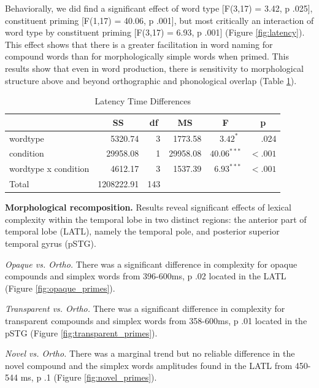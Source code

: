 \documentclass{frontiersSCNS}
\begin{document}
Behaviorally, we did find a significant effect of word type [F(3,17) = 3.42, p \lessthan .025], constituent priming [F(1,17) = 40.06, p \lessthan .001], but most critically an interaction of word type by constituent priming [F(3,17) = 6.93, p \lessthan .001] (Figure \ref{fig:latency}). This effect shows that there is a greater facilitation in word naming for compound words than for morphologically simple words when primed. This results show that even in word production, there is sensitivity to morphological structure above and beyond orthographic and phonological overlap (Table \ref{tab:latency}). 

\begin{table}
\begin{center}
\begin{tabular}{lrrrrr}
\toprule
& \multicolumn{1}{c}{\textbf{SS}} & \multicolumn{1}{c}{\textbf{df}} & \multicolumn{1}{c}{\textbf{MS}} & \multicolumn{1}{c}{\textbf{F}} & \multicolumn{1}{c}{\textbf{p}} \\
\midrule
wordtype & 5320.74 & 3 & 1773.58 & $3.42^{* \ \ }$ & .024 \\
condition & 29958.08 & 1 & 29958.08 & $40.06^{***}$ & $< .001$ \\
wordtype x condition & 4612.17 & 3 & 1537.39 & $6.93^{***}$ & $< .001$ \\
\midrule
Total & 1208222.91 & 143 \\
\bottomrule
\end{tabular}\caption{\label{tab:latency} Latency Time Differences}
\end{center}
\end{table}

\textbf{Morphological recomposition.} Results reveal significant effects of lexical complexity within the temporal lobe in two distinct regions: the anterior part of temporal lobe (LATL), namely the temporal pole, and posterior superior temporal gyrus (pSTG). 

\textit{Opaque vs. Ortho.} There was a significant difference in complexity for opaque compounds and simplex words from 396-600ms, p \lessthan .02 located in the LATL (Figure \ref{fig:opaque_primes}).  

\textit{Transparent vs. Ortho.} There was a significant difference in complexity for transparent compounds and simplex words from 358-600ms, p \lessthan .01 located in the pSTG (Figure \ref{fig:transparent_primes}).

\textit{Novel vs. Ortho.} There was a marginal trend but no reliable difference in the novel compound and the simplex words amplitudes found in the LATL from 450-544 ms, p \lessthan .1 (Figure \ref{fig:novel_primes}). 
\end{document}
